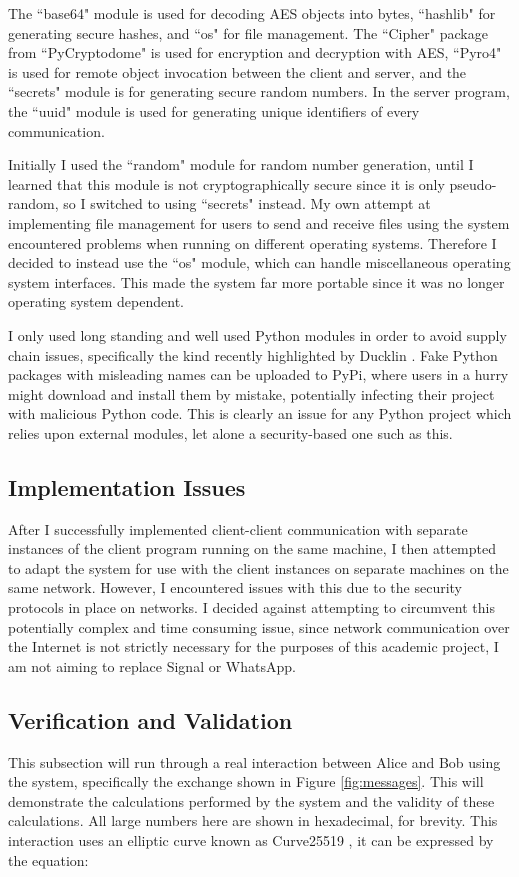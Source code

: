 \documentclass[12pt,a4paper]{article}
\begin{document}
The ``base64" module is used for decoding AES objects into bytes, 
``hashlib" for generating secure hashes, 
and ``os" for file management. 
The ``Cipher" package from ``PyCryptodome" is used for encryption and decryption with AES, 
``Pyro4" is used for remote object invocation between the client and server, 
and the ``secrets" module is for generating secure random numbers. 
In the server program, the ``uuid" module is used for generating unique identifiers of every communication. 

Initially I used the ``random" module for random number generation, 
until I learned that this module is not cryptographically secure since it is only pseudo-random, so I switched to using ``secrets" instead. 
My own attempt at implementing file management for users to send and receive files 
using the system encountered problems when running on different operating systems. 
Therefore I decided to instead use the ``os" module, which can handle miscellaneous operating system interfaces. 
This made the system far more portable since it was no longer operating system dependent. 

I only used long standing and well used Python modules in order to avoid supply chain issues, 
specifically the kind recently highlighted by Ducklin \citeyear{ducklin2021python}. 
Fake Python packages with misleading names can be uploaded to PyPi, where users in a hurry might download and install them by mistake, 
potentially infecting their project with malicious Python code. 
This is clearly an issue for any Python project which relies upon external modules, let alone a security-based one such as this. 


\subsection{Implementation Issues} \noindent \label{Implementation}
After I successfully implemented client-client communication with separate instances of the client program running on the 
same machine, I then attempted to adapt the system for use with the client instances on separate machines on the same network. 
However, I encountered issues with this due to the security protocols in place on networks. 
I decided against attempting to circumvent this potentially complex and time consuming issue, 
since network communication over the Internet is not strictly necessary for the purposes of this academic project, 
I am not aiming to replace Signal or WhatsApp. 


\subsection{Verification and Validation} \noindent \label{Verification}
This subsection will run through a real interaction between Alice and Bob using the system, 
specifically the exchange shown in Figure \ref{fig:messages}. 
This will demonstrate the calculations performed by the system and the validity of these calculations. 
All large numbers here are shown in hexadecimal, for brevity. 
This interaction uses an elliptic curve known as Curve25519 \cite{10.1007/11745853_14}, 
it can be expressed by the equation: 
\end{document}
